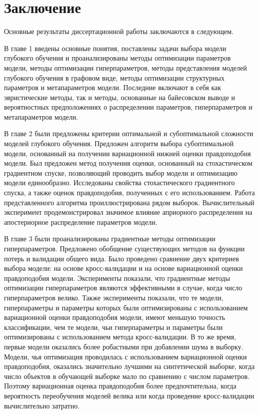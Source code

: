 
\chapter*{Заключение}
Основные результаты диссертационной работы заключаются в следующем.

В главе 1 введены основные понятия, поставлены задачи выбора модели глубокого обучения и проанализированы
методы оптимизации параметров модели, методы оптимизации гиперпараметров, методы представления моделей глубокого обучения в графовом виде, методы оптимизации структурных параметров и метапараметров модели. Последние включают в себя как эвристические методы, так и методы, основанные на байесовском выводе и вероятностных предположениях о распределении параметров, гиперпараметров и метапараметров модели.

В главе 2 были предложены критерии оптимальной и субоптимальной сложности моделей глубокого обучения. Предложен алгоритм выбора субоптимальной модели, основанный на получении вариационной нижней оценки  правдоподобия модели. Был предложен метод получения оценки, основанный на стохастическом градиентном спуске, позволяющий проводить выбор модели и оптимизацию модели единообразно. Исследованы свойства стохастического градиентного спуска, а также оценок правдоподобия, полученных с его использованием. 
Работа представленного алгоритма проиллюстрирована рядом выборок. 
Вычислительный эксперимент продемонстрировал значимое влияние априорного распределения на апостериорное распределение параметров модели. 

В главе 3 были проанализированы градиентные методы оптимизации гиперпараметров. Предложено обобщение существующих методов на функции потерь и валидации общего вида.
Было проведено сравнение двух критериев выбора модели: на основе кросс-валидации и на основе вариационной оценки правдоподобия модели.
Эксперименты показали, что градиентные методы оптимизации гиперпараметров являются эффективными в случае, когда число гиперпараметров велико. Также эксперименты показали, что те модели, гиперпараметры и параметры которых были оптимизированы с использованием вариационной оценки правдоподобия модели, имеют меньшую точность классификации, чем те модели, чьи гиперпараметры и параметры были оптимизированы с использованием метода кросс-валидации. В то же время, первые модели оказались более робастными при добавлении шума в выборку. Модели, чья оптимизация проводилась с использованием вариационной оценки правдоподобия, оказались значительно лучшими на синтетической выборке, когда число объектов в обучающей выборке мало по сравнению с числом параметров. Поэтому вариационная оценка правдоподобия более предпочтительна, когда вероятность переобучения моделей велика или когда проведение кросс-валидации вычислительно затратно.

